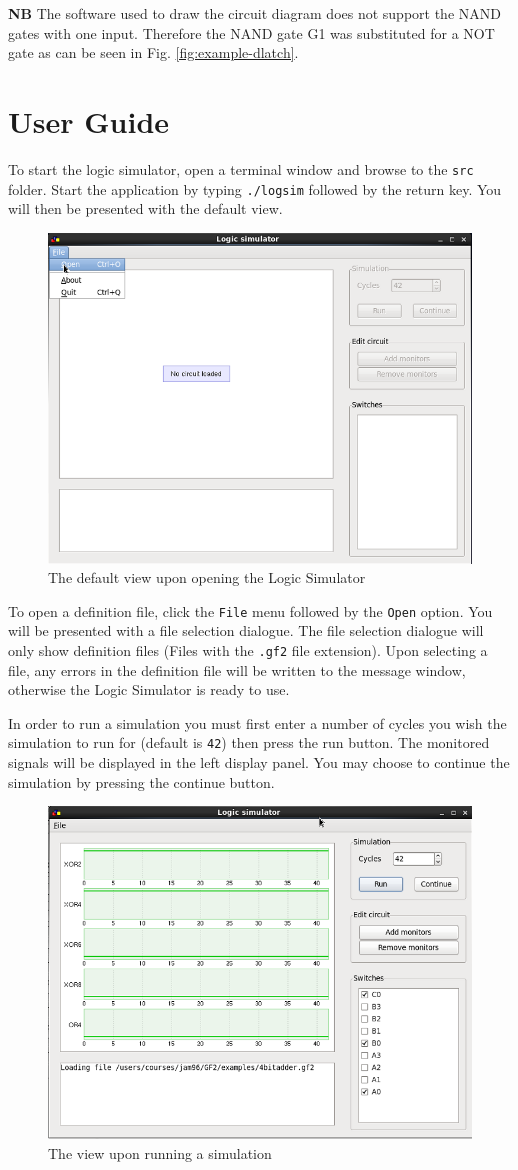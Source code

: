 \documentclass[a4paper,10pt]{article}
\begin{document}
\textbf{NB} The software used to draw the circuit diagram does not support the NAND gates with one input. Therefore the NAND gate G1 was substituted for a NOT gate as can be seen in Fig. \ref{fig:example-dlatch}.

\pagebreak

\section{User Guide}

To start the logic simulator, open a terminal window and browse to the \texttt{src} folder. Start the application by typing \texttt{./logsim} followed by the return key. You will then be presented with the default view.

\begin{figure}[h]
 \centering
 \includegraphics[width=.4\textwidth]{default}
 \caption{The default view upon opening the Logic Simulator}
 \label{fig:default}
\end{figure}

To open a definition file, click the \texttt{File} menu followed by the \texttt{Open} option. You will be presented with a file selection dialogue. The file selection dialogue will only show definition files (Files with the \texttt{.gf2} file extension). Upon selecting a file, any errors in the definition file will be written to the message window, otherwise the Logic Simulator is ready to use. 

In order to run a simulation you must first enter a number of cycles you wish the simulation to run for (default is \texttt{42}) then press the run button. The monitored signals will be displayed in the left display panel. You may choose to continue the simulation by pressing the continue button.

\begin{figure}[h]
 \centering
 \includegraphics[width=.4\textwidth]{simulation}
 \caption{The  view upon running a simulation}
 \label{fig:default}
\end{figure}
\end{document}
